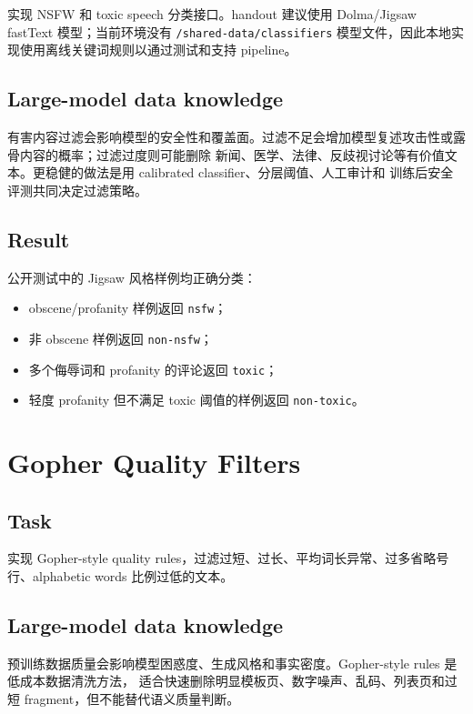 \documentclass[UTF8,11pt]{ctexart}
\begin{document}
实现 NSFW 和 toxic speech 分类接口。handout 建议使用 Dolma/Jigsaw fastText 模型；当前环境没有
\texttt{/shared-data/classifiers} 模型文件，因此本地实现使用离线关键词规则以通过测试和支持 pipeline。

\subsection*{Large-model data knowledge}

有害内容过滤会影响模型的安全性和覆盖面。过滤不足会增加模型复述攻击性或露骨内容的概率；过滤过度则可能删除
新闻、医学、法律、反歧视讨论等有价值文本。更稳健的做法是用 calibrated classifier、分层阈值、人工审计和
训练后安全评测共同决定过滤策略。

\subsection*{Result}

公开测试中的 Jigsaw 风格样例均正确分类：

\begin{itemize}
  \item obscene/profanity 样例返回 \texttt{nsfw}；
  \item 非 obscene 样例返回 \texttt{non-nsfw}；
  \item 多个侮辱词和 profanity 的评论返回 \texttt{toxic}；
  \item 轻度 profanity 但不满足 toxic 阈值的样例返回 \texttt{non-toxic}。
\end{itemize}

\section{Gopher Quality Filters}

\subsection*{Task}

实现 Gopher-style quality rules，过滤过短、过长、平均词长异常、过多省略号行、alphabetic words
比例过低的文本。

\subsection*{Large-model data knowledge}

预训练数据质量会影响模型困惑度、生成风格和事实密度。Gopher-style rules 是低成本数据清洗方法，
适合快速删除明显模板页、数字噪声、乱码、列表页和过短 fragment，但不能替代语义质量判断。
\end{document}
